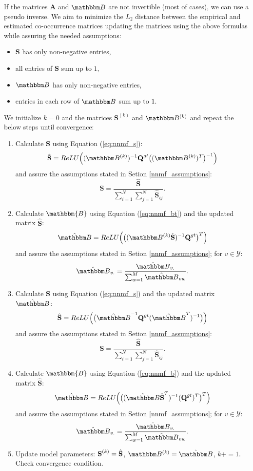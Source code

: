 \documentclass[shortabstract]{iithesis}
\begin{document}
If the matrices $\textbf{A}$ and $\mathbbm B$ are not invertible (most of cases), we can use a pseudo inverse. We aim to minimize the $L_2$ distance between the empirical and estimated co-occurrence matrices updating the matrices using the above formulas while assuring the needed assumptions:

\begin{itemize} \label{nnmf_assumptions}
    \item $\textbf{S}$ has only non-negative entries,
    \item all entries of $\textbf{S}$  sum up to $1$,
    \item $\mathbbm B$ has only non-negative entries,
    \item entries in each row of $\mathbbm B$ sum up to $1$.
\end{itemize}

\pagebreak

We initialize $k=0$ and the matrices $\textbf{S}^{(k)}$ and $\mathbbm B^{(k)}$ and repeat the below steps until convergence:

\begin{enumerate}
    \item Calculate $\textbf{S}$ using Equation (\ref{eq:nnmf_s}): 
        $$\hat{\textbf{S}} = ReLU\Big((\mathbbm B^{(k)})^{- 1} \textbf{Q}^{gt} \big((\mathbbm B^{(k)})^T\big)^{- 1}\Big)$$
        and assure the assumptions stated in Setion  \ref{nnmf_assumptions}:
        $$\hat{\textbf{S}} = \frac{\hat{\textbf{S}}}{\sum_{i=1}^N\sum_{j=1}^N \hat{\textbf{S}}_{ij}}\text{.}$$
    \item Calculate $\mathbbm{B}$ using Equation (\ref{eq:nnmf_bt}) and the updated matrix $\hat{\textbf{S}}$: 
        $$\hat{\mathbbm B} = ReLU\Big(\big((\mathbbm B^{(k)} \hat{\textbf{S}}) ^{- 1} \textbf{Q}^{gt}\big)^T\Big)$$
        and assure the assumptions stated in Setion  \ref{nnmf_assumptions}; for $v \in \mathcal Y$: 
        $$\hat{\mathbbm B}_{v.} = \frac{\hat{\mathbbm B}_{v.}}{\sum_{w=1}^M \hat{\mathbbm B}_{vw}}\text{.}$$
   \item Calculate $\textbf{S}$ using Equation (\ref{eq:nnmf_s}) and the updated matrix $\hat{\mathbbm B}$: 
        $$\hat{\textbf{S}} = ReLU\Big(\big(\hat{\mathbbm B}^{- 1} \textbf{Q}^{gt} (\hat{\mathbbm B}^T)^{- 1}\big)\Big)$$
        and assure the assumptions stated in  Setion  \ref{nnmf_assumptions}:
        $$\hat{\textbf{S}} = \frac{\hat{\textbf{S}}}{\sum_{i=1}^N\sum_{j=1}^N \hat{\textbf{S}}_{ij}}\text{.}$$
    \item Calculate $\mathbbm{B}$ using Equation (\ref{eq:nnmf_b}) and the updated matrix $\hat{\textbf{S}}$: 
    $$\hat{\mathbbm B} = ReLU\Big(\big((\hat{\mathbbm B} \hat{\textbf{S}}^T)^{- 1} (\textbf{Q}^{gt})^T\big)^T\Big)$$
         and assure the assumptions stated in Setion  \ref{nnmf_assumptions}; for $v \in \mathcal Y$: 
        $$\hat{\mathbbm B}_{v.} = \frac{\hat{\mathbbm B}_{v.}}{\sum_{w=1}^M \hat{\mathbbm B}_{vw}}\text{.}$$
    \item Update model parameters: $\textbf S^{(k)} = \hat{\textbf{S}}$, $\mathbbm B^{(k)} = \hat{\mathbbm B}$,  $k += 1$. Check convergence condition.
\end{enumerate}
\end{document}

